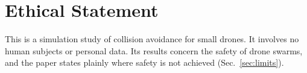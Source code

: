 \documentclass{article}
\begin{document}
\section*{Ethical Statement}
This is a simulation study of collision avoidance for small drones. It involves no human subjects
or personal data. Its results concern the safety of drone swarms, and the paper states plainly
where safety is not achieved (Sec.~\ref{sec:limits}).



\end{document}
